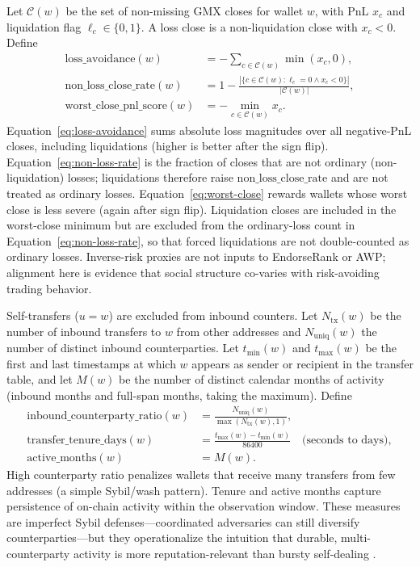 Let $\mathcal{C}(w)$ be the set of non-missing GMX closes for wallet $w$, with PnL $x_c$ and liquidation flag $\ell_c\in\{0,1\}$. A loss close is a non-liquidation close with $x_c<0$. Define
\begin{align}
\mathrm{loss\_avoidance}(w)
&=
-\sum_{c\in\mathcal{C}(w)} \min(x_c,0),
\label{eq:loss-avoidance}\\
\mathrm{non\_loss\_close\_rate}(w)
&=
1-\frac{|\{c\in\mathcal{C}(w):\ell_c=0\land x_c<0\}|}{|\mathcal{C}(w)|},
\label{eq:non-loss-rate}\\
\mathrm{worst\_close\_pnl\_score}(w)
&=
-\min_{c\in\mathcal{C}(w)} x_c.
\label{eq:worst-close}
\end{align}
Equation~\eqref{eq:loss-avoidance} sums absolute loss magnitudes over all negative-PnL closes, including liquidations (higher is better after the sign flip). Equation~\eqref{eq:non-loss-rate} is the fraction of closes that are not ordinary (non-liquidation) losses; liquidations therefore raise $\mathrm{non\_loss\_close\_rate}$ and are not treated as ordinary losses. Equation~\eqref{eq:worst-close} rewards wallets whose worst close is less severe (again after sign flip). Liquidation closes are included in the worst-close minimum but are excluded from the ordinary-loss count in Equation~\eqref{eq:non-loss-rate}, so that forced liquidations are not double-counted as ordinary losses. Inverse-risk proxies are not inputs to EndorseRank or AWP; alignment here is evidence that social structure co-varies with risk-avoiding trading behavior.


Self-transfers ($u=w$) are excluded from inbound counters. Let $N_{\mathrm{tx}}(w)$ be the number of inbound transfers to $w$ from other addresses and $N_{\mathrm{uniq}}(w)$ the number of distinct inbound counterparties. Let $t_{\min}(w)$ and $t_{\max}(w)$ be the first and last timestamps at which $w$ appears as sender or recipient in the transfer table, and let $M(w)$ be the number of distinct calendar months of activity (inbound months and full-span months, taking the maximum). Define
\begin{align}
\mathrm{inbound\_counterparty\_ratio}(w)
&=
\frac{N_{\mathrm{uniq}}(w)}{\max(N_{\mathrm{tx}}(w),1)},
\label{eq:counterparty-ratio}\\
\mathrm{transfer\_tenure\_days}(w)
&=
\frac{t_{\max}(w)-t_{\min}(w)}{86400}\quad\text{(seconds to days)},
\label{eq:tenure}\\
\mathrm{active\_months}(w)
&=
M(w).
\label{eq:active-months}
\end{align}
High counterparty ratio penalizes wallets that receive many transfers from few addresses (a simple Sybil/wash pattern). Tenure and active months capture persistence of on-chain activity within the observation window. These measures are imperfect Sybil defenses---coordinated adversaries can still diversify counterparties---but they operationalize the intuition that durable, multi-counterparty activity is more reputation-relevant than bursty self-dealing .


